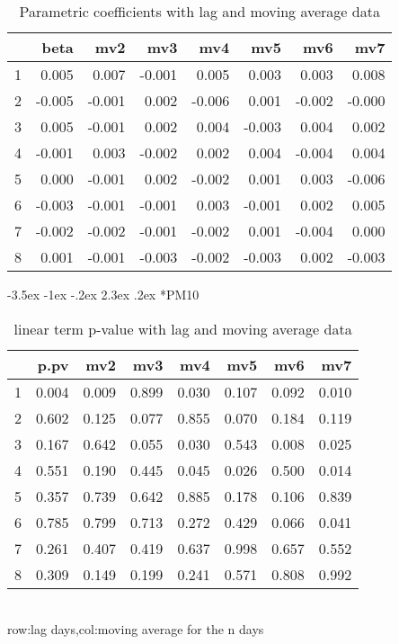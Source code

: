 \documentclass[a4paper, 12pt]{article}
\makeatletter
\def\large{\fontsize{14}{20}\selectfont}
\renewcommand\subsection{\@startsection {subsection}{1}{\z@}%
                                   {-3.5ex \@plus -1ex \@minus -.2ex}%
                                   {2.3ex \@plus.2ex}%
                                   {\centering\normalfont\large\bfseries}}
\makeatother
\begin{document}
\begin{table}[h]
\centering
\caption{Parametric coefficients with lag and moving average data}
\begin{tabular}{rrrrrrrr}
  \hline
 & beta & mv2 & mv3 & mv4 & mv5 & mv6 & mv7 \\
  \hline
1 & 0.005 & 0.007 & -0.001 & 0.005 & 0.003 & 0.003 & 0.008 \\
  2 & -0.005 & -0.001 & 0.002 & -0.006 & 0.001 & -0.002 & -0.000 \\
  3 & 0.005 & -0.001 & 0.002 & 0.004 & -0.003 & 0.004 & 0.002 \\
  4 & -0.001 & 0.003 & -0.002 & 0.002 & 0.004 & -0.004 & 0.004 \\
  5 & 0.000 & -0.001 & 0.002 & -0.002 & 0.001 & 0.003 & -0.006 \\
  6 & -0.003 & -0.001 & -0.001 & 0.003 & -0.001 & 0.002 & 0.005 \\
  7 & -0.002 & -0.002 & -0.001 & -0.002 & 0.001 & -0.004 & 0.000 \\
  8 & 0.001 & -0.001 & -0.003 & -0.002 & -0.003 & 0.002 & -0.003 \\
   \hline
\end{tabular}
\end{table}
\clearpage
\subsection*{PM10}
\begin{table}[h]
\centering
\caption{linear term p-value with lag and moving average data}
\begin{tabular}{rrrrrrrr}
  \hline
 & p.pv & mv2 & mv3 & mv4 & mv5 & mv6 & mv7 \\
  \hline
1 & 0.004 & 0.009 & 0.899 & 0.030 & 0.107 & 0.092 & 0.010 \\
  2 & 0.602 & 0.125 & 0.077 & 0.855 & 0.070 & 0.184 & 0.119 \\
  3 & 0.167 & 0.642 & 0.055 & 0.030 & 0.543 & 0.008 & 0.025 \\
  4 & 0.551 & 0.190 & 0.445 & 0.045 & 0.026 & 0.500 & 0.014 \\
  5 & 0.357 & 0.739 & 0.642 & 0.885 & 0.178 & 0.106 & 0.839 \\
  6 & 0.785 & 0.799 & 0.713 & 0.272 & 0.429 & 0.066 & 0.041 \\
  7 & 0.261 & 0.407 & 0.419 & 0.637 & 0.998 & 0.657 & 0.552 \\
  8 & 0.309 & 0.149 & 0.199 & 0.241 & 0.571 & 0.808 & 0.992 \\
   \hline
\end{tabular}
\\row:lag days,col:moving average for the n days
\end{table}
\end{document}
